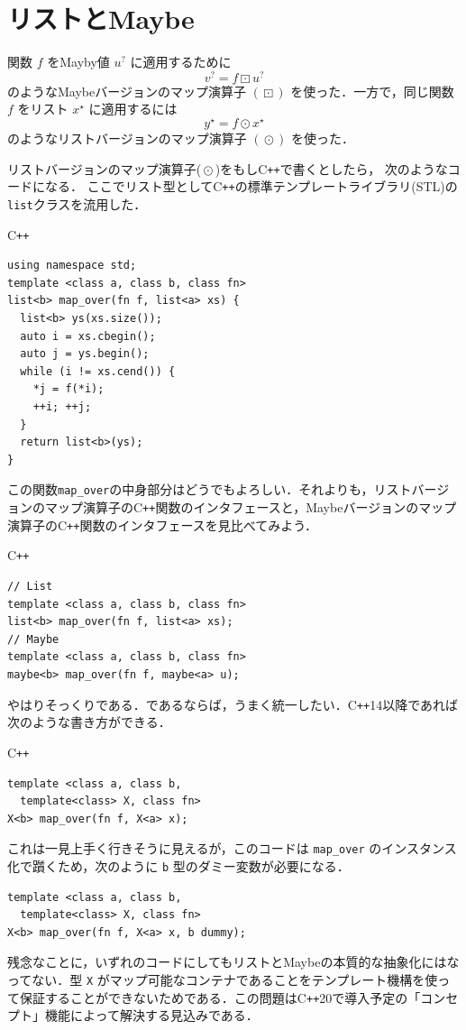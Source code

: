 \documentclass[a4paper,twocolumn]{jsbook}
\newcommand{\programminglanguage}[1]{\textsf{#1}}
\newcommand{\cxx}{\programminglanguage{C}\texttt{++}}
\newcommand{\cxxfourteen}{\cxx\programminglanguage{14}}
\newcommand{\cxxtwelve}{\cxx\programminglanguage{20}}
\newcommand{\code}[1]{\texttt{#1}}
\newenvironment{cxxcode}{\begin{itembox}[r]{\cxx}}{\end{itembox}}
\DeclareMathOperator{\mMapList}{\odot}
\DeclareMathOperator{\mMapMaybe}{\boxdot}
\newcommand{\mList}[1]{{#1}^\mathrm{\star}}
\newcommand{\mMaybe}[1]{{#1}^\text{?}}
\begin{document}
\section{リストとMaybe}

関数 $f$ をMayby値 $\mMaybe{u}$ に適用するために
\begin{equation}
\mMaybe{v}=f\mMapMaybe\mMaybe{u}
\end{equation}
のようなMaybeバージョンのマップ演算子 $(\mMapMaybe)$ を使った．一方で，同じ関数 $f$ をリスト $\mList{x}$ に適用するには
\begin{equation}
\mList{y}=f\mMapList\mList{x}
\end{equation}
のようなリストバージョンのマップ演算子 $(\mMapList)$ を使った．

リストバージョンのマップ演算子($\mMapList$)をもし\cxx で書くとしたら，
次のようなコードになる．
ここでリスト型として\cxx の標準テンプレートライブラリ(STL)の
\code{list}クラスを流用した．
\begin{cxxcode}
\begin{verbatim}
using namespace std;
template <class a, class b, class fn>
list<b> map_over(fn f, list<a> xs) {
  list<b> ys(xs.size());
  auto i = xs.cbegin();
  auto j = ys.begin();
  while (i != xs.cend()) {
    *j = f(*i);
    ++i; ++j;
  }
  return list<b>(ys);
}
\end{verbatim}
\end{cxxcode}
この関数\code{map\_over}の中身部分はどうでもよろしい．それよりも，リストバージョンのマップ演算子の\cxx 関数のインタフェースと，Maybeバージョンのマップ演算子の\cxx 関数のインタフェースを見比べてみよう．
\begin{cxxcode}
\begin{verbatim}
// List
template <class a, class b, class fn>
list<b> map_over(fn f, list<a> xs);
// Maybe
template <class a, class b, class fn>
maybe<b> map_over(fn f, maybe<a> u);
\end{verbatim}
\end{cxxcode}
やはりそっくりである．であるならば，うまく統一したい．\cxxfourteen 以降であれば次のような書き方ができる．
\begin{cxxcode}
\begin{verbatim}
template <class a, class b,
  template<class> X, class fn>
X<b> map_over(fn f, X<a> x);
\end{verbatim}
\end{cxxcode}
これは一見上手く行きそうに見えるが，このコードは \code{map\_over} のインスタンス化で躓くため，次のように \code{b} 型のダミー変数が必要になる．
\begin{verbatim}
template <class a, class b,
  template<class> X, class fn>
X<b> map_over(fn f, X<a> x, b dummy);
\end{verbatim}
残念なことに，いずれのコードにしてもリストとMaybeの本質的な抽象化にはなってない．型 \code{X} がマップ可能なコンテナであることをテンプレート機構を使って保証することができないためである．この問題は\cxxtwelve で導入予定の「コンセプト」機能によって解決する見込みである．
\end{document}
